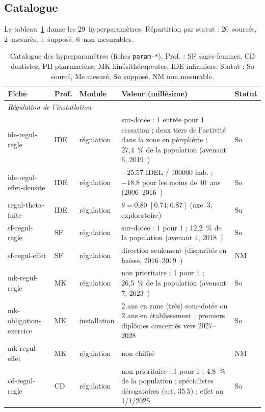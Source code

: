 \subsection{Catalogue}

Le tableau~\ref{a1-tab:catalogue} donne les 29~hyperparamètres. Répartition
par statut : 20~sourcés, 2~mesurés, 1~supposé, 6~non mesurables.

\begin{table}[p]
\centering\scriptsize
\caption{Catalogue des hyperparamètres (fiches \texttt{param-*}). Prof. : SF sages-femmes, CD dentistes, PH pharmaciens, MK kinésithérapeutes, IDE infirmiers. Statut : So sourcé, Me mesuré, Su supposé, NM non mesurable.}\label{a1-tab:catalogue}
\begin{tabular}{p{2.6cm}p{1.1cm}p{1.6cm}p{6.6cm}p{0.5cm}}
\toprule
Fiche & Prof. & Module & Valeur (millésime) & Statut \\
\midrule
\multicolumn{5}{l}{\emph{Régulation de l'installation}} \\
ide-regul-regle & IDE & régulation & sur-dotée : 1 entrée pour 1 cessation ; deux tiers de l'activité dans la zone en périphérie ; 27,4~\%\derive{} de la population (avenant 6, 2019~\cite{a1-avenant6ide}) & So \\
ide-regul-effet-densite & IDE & régulation & $\num{-25.57}$ IDEL / \num{100000} hab. ; $\num{-18.8}$ pour les moins de 40~ans (2006--2016~\cite{a1-irdes270}) & So \\
regul-theta-fuite & IDE & régulation & $\theta = \num{0.80}$ $[\num{0.74} ; \num{0.87}]$\suppose{} (axe~3, exploratoire) & Su \\
sf-regul-regle & SF & régulation & sur-dotée : 1 pour 1 ; 12,2~\%\derive{} de la population (avenant 4, 2018~\cite{a1-avenant4sf}) & So \\
sf-regul-effet & SF & régulation & direction seulement (disparités en baisse, 2016--2019~\cite{a1-igas2023}) & NM \\
mk-regul-regle & MK & régulation & non prioritaire : 1 pour 1 ; 26,5~\%\derive{} de la population (avenant 7, 2023~\cite{a1-avenant7mk}) & So \\
mk-obligation-exercice & MK & installation & 2 ans en zone (très) sous-dotée ou 2 ans en établissement ; premiers diplômés concernés vers 2027--2028\derive{}~\cite{a1-avenant7mk} & So \\
mk-regul-effet & MK & régulation & non chiffré & NM \\
cd-regul-regle & CD & régulation & non prioritaire : 1 pour 1 ; 4,8~\%\derive{} de la population ; spécialistes dérogatoires (art. 35.5) ; effet au 1/1/2025~\cite{a1-conventioncd2023} & So \\

\end{tabular}
\end{table}
